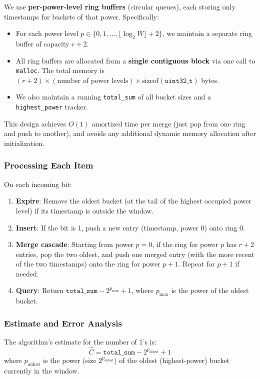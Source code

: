 \documentclass[11pt]{article}
\begin{document}
We use \textbf{per-power-level ring buffers} (circular queues), each storing only timestamps for buckets of that power. Specifically:
\begin{itemize}
\item For each power level $p \in \{0, 1, \ldots, \lfloor \log_2 W \rfloor + 2\}$, we maintain a separate ring buffer of capacity $r + 2$.
\item All ring buffers are allocated from a \textbf{single contiguous block} via one call to \texttt{malloc}. The total memory is $(r + 2) \times (\text{number of power levels}) \times \text{sizeof}(\texttt{uint32\_t})$ bytes.
\item We also maintain a running \texttt{total\_sum} of all bucket sizes and a \texttt{highest\_power} tracker.
\end{itemize}

\noindent
This design achieves $O(1)$ amortized time per merge (just pop from one ring and push to another), and avoids any additional dynamic memory allocation after initialization.

\subsubsection*{Processing Each Item}

On each incoming bit:
\begin{enumerate}
\item \textbf{Expire}: Remove the oldest bucket (at the tail of the highest occupied power level) if its timestamp is outside the window.
\item \textbf{Insert}: If the bit is 1, push a new entry (timestamp, power 0) onto ring 0.
\item \textbf{Merge cascade}: Starting from power $p = 0$, if the ring for power $p$ has $r + 2$ entries, pop the two oldest, and push one merged entry (with the more recent of the two timestamps) onto the ring for power $p + 1$. Repeat for $p + 1$ if needed.
\item \textbf{Query}: Return $\texttt{total\_sum} - 2^{p_{\max}} + 1$, where $p_{\max}$ is the power of the oldest bucket.
\end{enumerate}

\subsubsection*{Estimate and Error Analysis}

The algorithm's estimate for the number of 1's is:
\[
  \hat{C} = \texttt{total\_sum} - 2^{p_{\text{oldest}}} + 1
\]
where $p_{\text{oldest}}$ is the power (size $2^{p_{\text{oldest}}}$) of the oldest (highest-power) bucket currently in the window.
\end{document}
